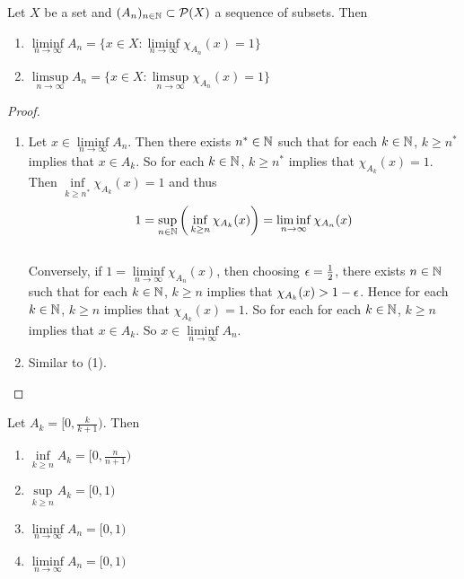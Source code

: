\documentclass{book}
\begin{document}
	\begin{ex}  
		Let $X$ be a set and $(A_n)_{n \in \mathbb{N}} \subset \mathcal{P}(X)$ a sequence of subsets. Then 
		\begin{enumerate}
			\item $\liminf\limits_{n \rightarrow \infty}A_n = \bigg \{x \in X: \liminf\limits_{n \rightarrow \infty}\chi_{A_n}(x) = 1\bigg\}$
			\item $\limsup\limits_{n \rightarrow \infty}A_n = \bigg \{x \in X: \limsup\limits_{n \rightarrow \infty}\chi_{A_n}(x) = 1\bigg\}$
		\end{enumerate}
	\end{ex}
	
	\begin{proof}\
		\begin{enumerate}
			\item Let $x \in \liminf\limits_{n \rightarrow \infty}A_n$. Then there exists $n^* \in \mathbb{N}$ such that for each $k \in \mathbb{N}$, $k \geq n^*$ implies that $x \in A_k$. So for each $k \in \mathbb{N}$, $k \geq n^*$ implies that $\chi_{A_k}(x) = 1$. Then $\inf\limits_{k \geq n^*}\chi_{A_k}(x) = 1$ and thus $$1 = \sup\limits_{n \in \mathbb{N}} \bigg(\inf\limits_{k \geq n} \chi_{A_k}(x) \bigg) = \liminf_{n \rightarrow \infty}\chi_{A_n}(x)$$ \vspace{3mm} \\
			Conversely, if $1 = \liminf\limits_{n \rightarrow \infty}\chi_{A_n}(x)$, then choosing $\epsilon = \frac{1}{2}$, there exists $n \in \mathbb{N}$ such that for each $k \in \mathbb{N}$, $k \geq n$ implies that $\chi_{A_k}(x) > 1-\epsilon$. Hence for each $k \in \mathbb{N}$, $k \geq n$ implies that $\chi_{A_k}(x) = 1$. So for each for each $k \in \mathbb{N}$, $k \geq n$ implies that $x \in A_k$. So $x \in \liminf\limits_{n \rightarrow \infty} A_n$. 
			\item Similar to (1).
		\end{enumerate}
	\end{proof}
	
	\begin{ex}  
		Let $A_k = [0, \frac{k}{k+1})$. Then 
		\begin{enumerate}
			\item $\inf\limits_{k \geq n}A_k = [0, \frac{n}{n+1})$ \\
			\item $\sup\limits_{k \geq n}A_k = [0,1)$ \\
			\item $\liminf\limits_{n \rightarrow \infty}A_n = [0,1)$ \\
			\item $\liminf\limits_{n \rightarrow \infty}A_n = [0,1)$
		\end{enumerate}
	\end{ex}
	
\end{document}
